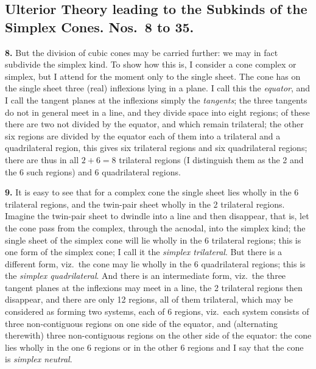 \documentclass[11pt,a4paper]{article}
\theoremstyle{plain}
\begin{document}
\subsection*{Ulterior Theory leading to the Subkinds of the Simplex Cones. Nos.\ 8 to 35.}

\noindent\textbf{8.} But the division of cubic cones may be carried further: we may in fact subdivide the simplex kind. To show how this is, I consider a cone complex or simplex, but I attend for the moment only to the single sheet. The cone has on the single sheet three (real) inflexions lying in a plane. I call this the \textit{equator}, and I call the tangent planes at the inflexions simply the \textit{tangents}; the three tangents do not in general meet in a line, and they divide space into eight regions; of these there are two not divided by the equator, and which remain trilateral; the other six regions are divided by the equator each of them into a trilateral and a quadrilateral region, this gives six trilateral regions and six quadrilateral regions; there are thus in all $2+6=8$ trilateral regions (I distinguish them as the 2 and the 6 such regions) and 6 quadrilateral regions.

\noindent\textbf{9.} It is easy to see that for a complex cone the single sheet lies wholly in the 6 trilateral regions, and the twin-pair sheet wholly in the 2 trilateral regions. Imagine the twin-pair sheet to dwindle into a line and then disappear, that is, let the cone pass from the complex, through the acnodal, into the simplex kind; the single sheet of the simplex cone will lie wholly in the 6 trilateral regions; this is one form of the simplex cone; I call it the \textit{simplex trilateral}. But there is a different form, viz.\ the cone may lie wholly in the 6 quadrilateral regions; this is the \textit{simplex quadrilateral}. And there is an intermediate form, viz.\ the three tangent planes at the inflexions may meet in a line, the 2 trilateral regions then disappear, and there are only 12 regions, all of them trilateral, which may be considered as forming two systems, each of 6 regions, viz.\ each system consists of three non-contiguous regions on one side of the equator, and (alternating therewith) three non-contiguous regions on the other side of the equator: the cone lies wholly in the one 6 regions or in the other 6 regions and I say that the cone is \textit{simplex neutral}.
\end{document}
